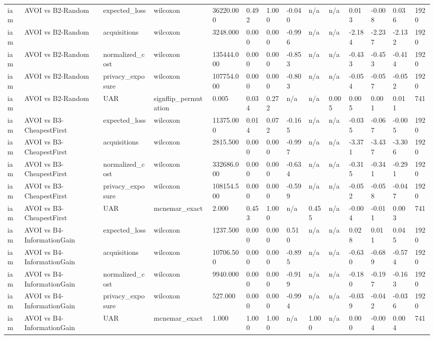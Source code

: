 \begin{table}[!ht]
{\begin{tabular}{llllllllllllll}
iam & AVOI vs B2-Random & expected\_loss & wilcoxon & 36220.000 & 0.492 & 1.000 & -0.040 & n/a & n/a & 0.013 & -0.008 & 0.036 & 1920 \\
iam & AVOI vs B2-Random & acquisitions & wilcoxon & 3248.000 & 0.000 & 0.000 & -0.996 & n/a & n/a & -2.184 & -2.237 & -2.132 & 1920 \\
iam & AVOI vs B2-Random & normalized\_cost & wilcoxon & 135444.000 & 0.000 & 0.000 & -0.853 & n/a & n/a & -0.433 & -0.453 & -0.414 & 1920 \\
iam & AVOI vs B2-Random & privacy\_exposure & wilcoxon & 107754.000 & 0.000 & 0.000 & -0.803 & n/a & n/a & -0.054 & -0.057 & -0.052 & 1920 \\
iam & AVOI vs B2-Random & UAR & signflip\_permutation & 0.005 & 0.034 & 0.272 & n/a & n/a & 0.005 & 0.005 & 0.001 & 0.011 & 741 \\
iam & AVOI vs B3-CheapestFirst & expected\_loss & wilcoxon & 11375.000 & 0.014 & 0.072 & -0.165 & n/a & n/a & -0.035 & -0.067 & -0.005 & 1920 \\
iam & AVOI vs B3-CheapestFirst & acquisitions & wilcoxon & 2815.500 & 0.000 & 0.000 & -0.997 & n/a & n/a & -3.371 & -3.437 & -3.306 & 1920 \\
iam & AVOI vs B3-CheapestFirst & normalized\_cost & wilcoxon & 332686.000 & 0.000 & 0.000 & -0.634 & n/a & n/a & -0.315 & -0.341 & -0.291 & 1920 \\
iam & AVOI vs B3-CheapestFirst & privacy\_exposure & wilcoxon & 108154.500 & 0.000 & 0.000 & -0.599 & n/a & n/a & -0.052 & -0.058 & -0.047 & 1920 \\
iam & AVOI vs B3-CheapestFirst & UAR & mcnemar\_exact & 2.000 & 0.453 & 1.000 & n/a & 0.455 & n/a & -0.004 & -0.011 & 0.003 & 741 \\
iam & AVOI vs B4-InformationGain & expected\_loss & wilcoxon & 1237.500 & 0.000 & 0.000 & 0.510 & n/a & n/a & 0.028 & 0.011 & 0.045 & 1920 \\
iam & AVOI vs B4-InformationGain & acquisitions & wilcoxon & 10706.500 & 0.000 & 0.000 & -0.895 & n/a & n/a & -0.630 & -0.689 & -0.574 & 1920 \\
iam & AVOI vs B4-InformationGain & normalized\_cost & wilcoxon & 9940.000 & 0.000 & 0.000 & -0.919 & n/a & n/a & -0.180 & -0.197 & -0.163 & 1920 \\
iam & AVOI vs B4-InformationGain & privacy\_exposure & wilcoxon & 527.000 & 0.000 & 0.000 & -0.994 & n/a & n/a & -0.039 & -0.042 & -0.036 & 1920 \\
iam & AVOI vs B4-InformationGain & UAR & mcnemar\_exact & 1.000 & 1.000 & 1.000 & n/a & 1.000 & n/a & 0.000 & -0.004 & 0.004 & 741 \\

\end{tabular}}
\end{table}
